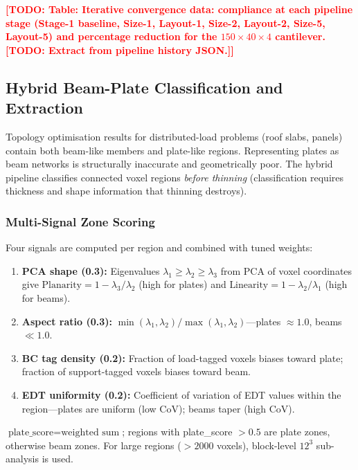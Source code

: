 \documentclass[11pt,a4paper]{article}
\newcommand{\TODO}[1]{\textcolor{red}{\textbf{[TODO: #1]}}}
\newcommand{\tblstub}[1]{\TODO{Table: #1}}
\begin{document}
\tblstub{Iterative convergence data: compliance at each pipeline stage
  (Stage-1 baseline, Size-1, Layout-1, Size-2, Layout-2, Size-5, Layout-5)
  and percentage reduction for the $150\times40\times4$ cantilever.
  \TODO{Extract from pipeline history JSON.}}

\subsection{Hybrid Beam-Plate Classification and Extraction}
\label{subsec:hybrid}

Topology optimisation results for distributed-load problems (roof slabs,
panels) contain both beam-like members and plate-like regions.
Representing plates as beam networks is structurally inaccurate and
geometrically poor.
The hybrid pipeline classifies connected voxel regions \emph{before thinning}
(classification requires thickness and shape information that thinning
destroys).

\subsubsection{Multi-Signal Zone Scoring}

Four signals are computed per region and combined with tuned weights:

\begin{enumerate}
    \item \textbf{PCA shape (0.3):}
          Eigenvalues $\lambda_1 \geq \lambda_2 \geq \lambda_3$ from PCA of
          voxel coordinates give
          $\text{Planarity} = 1 - \lambda_3/\lambda_2$ (high for plates) and
          $\text{Linearity} = 1 - \lambda_2/\lambda_1$ (high for beams).

    \item \textbf{Aspect ratio (0.3):}
          $\min(\lambda_1,\lambda_2)/\max(\lambda_1,\lambda_2)$---plates $\approx
          1.0$, beams $\ll 1.0$.

    \item \textbf{BC tag density (0.2):}
          Fraction of load-tagged voxels biases toward plate; fraction of
          support-tagged voxels biases toward beam.

    \item \textbf{EDT uniformity (0.2):}
          Coefficient of variation of EDT values within the region---plates are
          uniform (low CoV); beams taper (high CoV).
\end{enumerate}

$\text{plate\_score} = \text{weighted sum}$;
regions with plate\_score $> 0.5$ are plate zones, otherwise beam zones.
For large regions ($>2000$ voxels), block-level $12^3$ sub-analysis is used.
\end{document}
